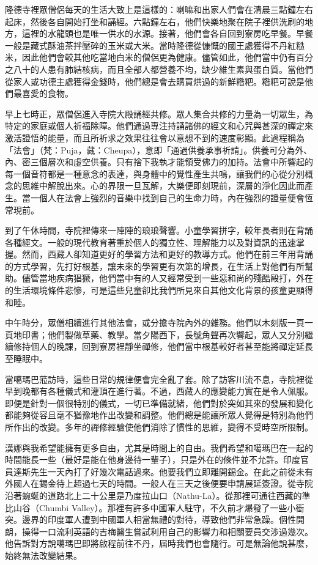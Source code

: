 隆德寺裡眾僧侶每天的生活大致上是這樣的：喇嘛和出家人們會在清晨三點鐘左右起床，然後各自開始打坐和誦經。六點鐘左右，他們快樂地聚在院子裡供洗刷的地方，這裡的水龍頭也是唯一供水的水源。接著，他們會各自回到寮房吃早餐。早餐一般是藏式酥油茶拌壓碎的玉米或大米。當時隆德從慷慨的國王處獲得不丹紅糙米，因此他們會較其他吃當地白米的僧侶更為健康。儘管如此，他們當中仍有百分之八十的人患有肺結核病，而且全部人都營養不均，缺少維生素與蛋白質。當他們從家人或功德主處獲得金錢時，他們總是會去購買烘過的新鮮糌粑。糌粑可說是他們最喜愛的食物。

早上七時正，眾僧侶進入寺院大殿誦經共修。眾人集合共修的力量為一切眾生，為特定的家庭或個人祈福除障。他們通過專注持誦諸佛的經文和心咒與甚深的禪定來激活證悟的能量，而且所祈求之效果往往會以意想不到的速度彰顯。此過程稱為「法會」（梵：Puja，藏：Cheupa），意即「通過供養承事祈請」。供養可分為外、內、密三個層次和虛空供養。只有捨下我執才能領受佛力的加持。法會中所響起的每一個音符都是一種意念的表達，與身體中的覺性產生共鳴，讓我們的心從分別概念的思維中解脫出來。心的界限一旦瓦解，大樂便即刻現前，深層的淨化因此而產生。當一個人在法會上強烈的音樂中找到自己的生命力時，內在強烈的證量便會恆常現前。

到了午休時間，寺院裡傳來一陣陣的琅琅聲響。小童學習拼字，較年長者則在背誦各種經文。一般的現代教育著重於個人的獨立性、理解能力以及對資訊的迅速掌握。然而，西藏人卻知道更好的學習方法和更好的教導方式。他們在前三年用背誦的方式學習，先打好根基，讓未來的學習更有次第的增長，在生活上對他們有所幫助。儘管當地疾病猖獗，他們當中有的人又經常受到一些惡和尚的殘酷毆打，外在的生活環境條件悲慘，可是這些兒童卻比我們所見來自其他文化背景的孩童更顯得和睦。

中午時分，眾僧相續進行其他法會，或分擔寺院內外的雜務。他們以木刻版一頁一頁地印書；他們製做草藥、教學。當夕陽西下，長號角聲再次響起，眾人又分別繼續修持個人的晚課，回到寮房裡靜坐禪修，他們當中根基較好者甚至能將禪定延長至睡眠中。

當噶瑪巴蒞訪時，這些日常的規律便會完全亂了套。除了訪客川流不息，寺院裡從早到晚都有各種儀式和灌頂在進行著。不過，西藏人的應變能力實在是令人佩服。即便是針對一個很特別的儀式，一切已準備就緒，他們對於突如其來的發展和變化都能夠從容且毫不猶豫地作出改變和調整。他們總是能讓所眾人覺得是特別為他們所作出的改變。多年的禪修經驗使他們消除了慣性的思維，變得不受時空所限制。

漢娜與我希望能擁有更多自由，尤其是時間上的自由。我們希望和噶瑪巴在一起的時間能長一些（最好是能在他身邊待一輩子），只是外在的條件並不允許。印度官員達斯先生一天內打了好幾次電話過來。他要我們立即離開錫金。在此之前從未有外國人在錫金待上超過七天的時間。一般人在三天之後便要申請展延簽證。從寺院沿著蜿蜒的道路北上二十公里是乃度拉山口（Nathu-La）。從那裡可通往西藏的準比山谷（Chumbi
Valley）。那裡有許多中國軍人駐守，不久前才爆發了一些小衝突。邊界的印度軍人遭到中國軍人相當無禮的對待，導致他們非常急躁。個性開朗，操得一口流利英語的吉梅醫生嘗試利用自己的影響力和相關要員交涉過幾次。他告訴對方說噶瑪巴即將啟程前往不丹，屆時我們也會隨行。可是無論他說甚麼，始終無法改變結果。

